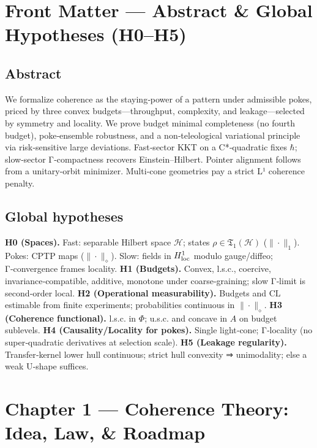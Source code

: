 \documentclass[
]{article}
\author{}
\date{}
\numberwithin{equation}{section}
\begin{document}
{
\setcounter{tocdepth}{2}
\tableofcontents
}
\hypertarget{front-matter-abstract-global-hypotheses-h0h5}{%
\section{Front Matter --- Abstract \& Global Hypotheses
(H0--H5)}\label{front-matter-abstract-global-hypotheses-h0h5}}

\hypertarget{abstract}{%
\subsection{Abstract}\label{abstract}}

We formalize coherence as the staying‑power of a pattern under
admissible pokes, priced by three convex budgets---throughput,
complexity, and leakage---selected by symmetry and locality. We prove
budget minimal completeness (no fourth budget), poke‑ensemble
robustness, and a non‑teleological variational principle via
risk‑sensitive large deviations. Fast‑sector KKT on a C*‑quadratic fixes
\(\hbar\); slow‑sector Γ‑compactness recovers Einstein--Hilbert. Pointer
alignment follows from a unitary‑orbit minimizer. Multi‑cone geometries
pay a strict L¹ coherence penalty.

\hypertarget{global-hypotheses}{%
\subsection{Global hypotheses}\label{global-hypotheses}}

\textbf{H0 (Spaces).} Fast: separable Hilbert space \(\mathcal H\);
states \(\rho\in\mathfrak T_1(\mathcal H)\) (\(\|\cdot\|_1\)). Pokes:
CPTP maps (\(\|\cdot\|_\diamond\)). Slow: fields in \(H^1_{\rm loc}\)
modulo gauge/diffeo; Γ‑convergence frames locality. \textbf{H1
(Budgets).} Convex, l.s.c., coercive, invariance‑compatible, additive,
monotone under coarse‑graining; slow Γ‑limit is second‑order local.
\textbf{H2 (Operational measurability).} Budgets and \(\mathrm{CL}\)
estimable from finite experiments; probabilities continuous in
\(\|\cdot\|_\diamond\). \textbf{H3 (Coherence functional).} l.s.c. in
\(\Phi\); u.s.c. and concave in \(A\) on budget sublevels. \textbf{H4
(Causality/Locality for pokes).} Single light‑cone; Γ‑locality (no
super‑quadratic derivatives at selection scale). \textbf{H5 (Leakage
regularity).} Transfer‑kernel lower hull continuous; strict hull
convexity ⇒ unimodality; else a weak U‑shape suffices.

\hypertarget{chapter-1-coherence-theory-idea-law-roadmap}{%
\section{Chapter 1 --- Coherence Theory: Idea, Law, \&
Roadmap}\label{chapter-1-coherence-theory-idea-law-roadmap}}
\end{document}
